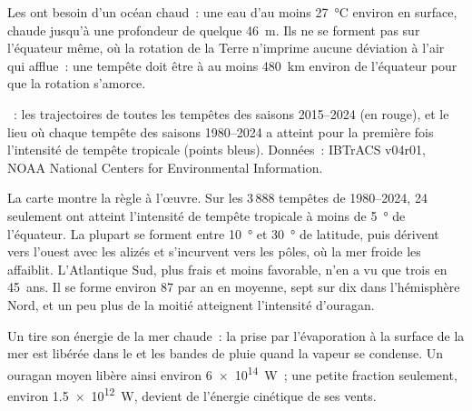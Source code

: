 Les  ont besoin d'un océan chaud~: une eau d'au moins
\qty{27}{\degreeCelsius} environ en surface, chaude jusqu'à une profondeur
de quelque \qty{46}{m}. Ils ne se forment pas sur l'équateur même, où la
rotation de la Terre n'imprime aucune déviation à l'air qui afflue~: une
tempête doit être à au moins \qty{480}{km} environ de l'équateur pour que
la rotation s'amorce.

\begin{omfigure}

{\small {}~: les trajectoires de toutes les tempêtes des
saisons 2015--2024 (en rouge), et le lieu où chaque tempête des saisons
1980--2024 a atteint pour la première fois l'intensité de tempête tropicale
(points bleus). Données~: IBTrACS v04r01, NOAA National Centers for
Environmental Information.}
\end{omfigure}

La carte montre la règle à l'œuvre. Sur les 3\,888 tempêtes de 1980--2024,
24 seulement ont atteint l'intensité de tempête tropicale à moins de
\qty{5}{\degree} de l'équateur. La plupart se forment entre \qty{10}{\degree}
et \qty{30}{\degree} de latitude, puis dérivent vers l'ouest avec les
alizés et s'incurvent vers les pôles, où la mer froide les affaiblit.
L'Atlantique Sud, plus frais et moins favorable, n'en a vu que trois en
45~ans. Il se forme environ 87  par an en moyenne, sept
sur dix dans l'hémisphère Nord, et un peu plus de la moitié atteignent
l'intensité d'ouragan.

\begin{proposition}\label{prop:g10:storms-and-cyclones:energy}
Un  tire son énergie de la mer chaude~: la 
prise par l'évaporation à la surface de la mer est libérée dans le  et les bandes de pluie quand la vapeur se condense. Un ouragan moyen
libère ainsi environ \qty{6e14}{W}~; une petite fraction seulement, environ
\qty{1.5e12}{W}, devient de l'énergie cinétique de ses vents.
\end{proposition}

